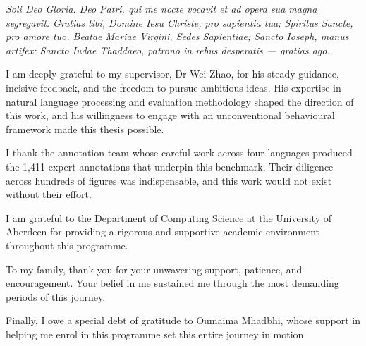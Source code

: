 \documentclass[MSc]{abdnthesis}
\begin{document}
\begin{acknowledgements}
  \textit{Soli Deo Gloria. Deo Patri, qui me nocte vocavit et ad opera
  sua magna segregavit. Gratias tibi, Domine Iesu Christe, pro sapientia
  tua; Spiritus Sancte, pro amore tuo. Beatae Mariae Virgini, Sedes
  Sapientiae; Sancto Ioseph, manus artifex; Sancto Iudae Thaddaeo,
  patrono in rebus desperatis --- gratias ago.}

  \medskip

  I am deeply grateful to my supervisor, Dr Wei Zhao, for his steady
  guidance, incisive feedback, and the freedom to pursue ambitious ideas.
  His expertise in natural language processing and evaluation methodology
  shaped the direction of this work, and his willingness to engage with
  an unconventional behavioural framework made this thesis possible.

  I thank the annotation team whose careful work across four languages
  produced the 1,411 expert annotations that underpin this benchmark.
  Their diligence across hundreds of figures was indispensable, and this
  work would not exist without their effort.

  I am grateful to the Department of Computing Science at the University
  of Aberdeen for providing a rigorous and supportive academic environment
  throughout this programme.

  To my family, thank you for your unwavering support, patience, and
  encouragement. Your belief in me sustained me through the most demanding
  periods of this journey.

  Finally, I owe a special debt of gratitude to Oumaima Mhadbhi, whose
  support in helping me enrol in this programme set this entire journey
  in motion.
\end{acknowledgements}



\tableofcontents

\listoffigures
{}
\listoftables
{}

\end{document}
